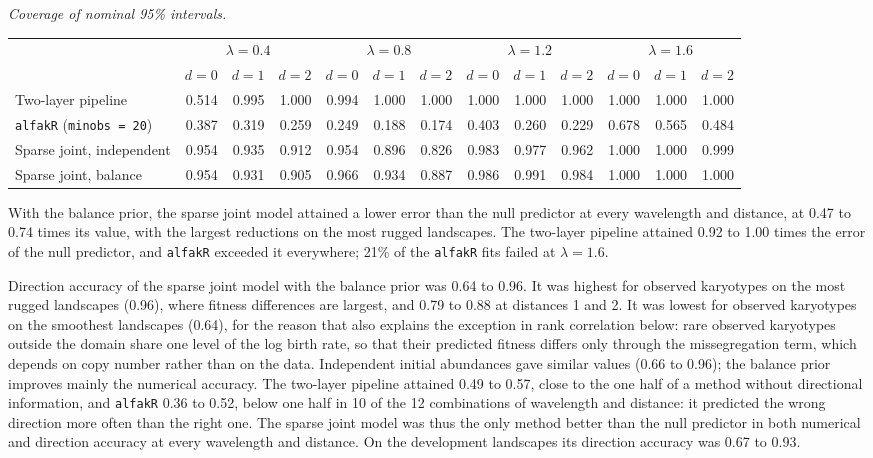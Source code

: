 \documentclass[11pt]{article}
\begin{document}
\noindent\textit{Coverage of nominal 95\% intervals.}
\begin{center}
\footnotesize
\setlength{\tabcolsep}{3pt}
\begin{tabular}{l*{12}{r}}
\toprule
 & \multicolumn{3}{c}{$\lambda=0.4$} & \multicolumn{3}{c}{$\lambda=0.8$} & \multicolumn{3}{c}{$\lambda=1.2$} & \multicolumn{3}{c}{$\lambda=1.6$} \\
\cmidrule(lr){2-4}\cmidrule(lr){5-7}\cmidrule(lr){8-10}\cmidrule(lr){11-13}
 & $d=0$ & $d=1$ & $d=2$ & $d=0$ & $d=1$ & $d=2$ & $d=0$ & $d=1$ & $d=2$ & $d=0$ & $d=1$ & $d=2$ \\
\midrule
Two-layer pipeline & 0.514 & 0.995 & 1.000 & 0.994 & 1.000 & 1.000 & 1.000 & 1.000 & 1.000 & 1.000 & 1.000 & 1.000 \\
\texttt{alfakR} (\texttt{minobs = 20}) & 0.387 & 0.319 & 0.259 & 0.249 & 0.188 & 0.174 & 0.403 & 0.260 & 0.229 & 0.678 & 0.565 & 0.484 \\
Sparse joint, independent & 0.954 & 0.935 & 0.912 & 0.954 & 0.896 & 0.826 & 0.983 & 0.977 & 0.962 & 1.000 & 1.000 & 0.999 \\
Sparse joint, balance & 0.954 & 0.931 & 0.905 & 0.966 & 0.934 & 0.887 & 0.986 & 0.991 & 0.984 & 1.000 & 1.000 & 1.000 \\
\bottomrule
\end{tabular}
\end{center}

With the balance prior, the sparse joint model attained a lower error than the
null predictor at every wavelength and distance, at 0.47 to 0.74 times its
value, with the largest reductions on the most rugged landscapes. The
two-layer pipeline attained 0.92 to 1.00 times the error of the null
predictor, and \texttt{alfakR} exceeded it everywhere; 21\% of the
\texttt{alfakR} fits failed at $\lambda=1.6$.

Direction accuracy of the sparse joint model with the balance prior was 0.64
to 0.96. It was highest for observed karyotypes on the most rugged landscapes
(0.96), where fitness differences are largest, and 0.79 to 0.88 at distances 1
and 2. It was lowest for observed karyotypes on the smoothest landscapes
(0.64), for the reason that also explains the exception in rank correlation
below: rare observed karyotypes outside the domain share one level of the log
birth rate, so that their predicted fitness differs only through the
missegregation term, which depends on copy number rather than on the data.
Independent initial abundances gave similar values (0.66 to 0.96); the
balance prior improves mainly the numerical accuracy. The two-layer pipeline
attained 0.49 to 0.57, close to the one half of a method without directional
information, and \texttt{alfakR} 0.36 to 0.52, below one half in 10 of the 12
combinations of wavelength and distance: it predicted the wrong direction
more often than the right one. The sparse joint model was thus the only
method better than the null predictor in both numerical and direction
accuracy at every wavelength and distance. On the development landscapes its
direction accuracy was 0.67 to 0.93.
\end{document}

